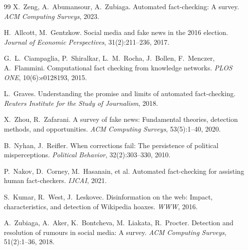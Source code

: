 \documentclass[11pt,a4paper]{article}
\theoremstyle{definition}
\begin{document}
\begin{thebibliography}{99}
X.~Zeng, A.~Abumansour, A.~Zubiaga.
\newblock Automated fact-checking: A survey.
\newblock \textit{ACM Computing Surveys}, 2023.

H.~Allcott, M.~Gentzkow.
\newblock Social media and fake news in the 2016 election.
\newblock \textit{Journal of Economic Perspectives}, 31(2):211--236, 2017.

G.~L.~Ciampaglia, P.~Shiralkar, L.~M.~Rocha, J.~Bollen, F.~Menczer, A.~Flammini.
\newblock Computational fact checking from knowledge networks.
\newblock \textit{PLOS ONE}, 10(6):e0128193, 2015.

L.~Graves.
\newblock Understanding the promise and limits of automated fact-checking.
\newblock \textit{Reuters Institute for the Study of Journalism}, 2018.

X.~Zhou, R.~Zafarani.
\newblock A survey of fake news: Fundamental theories, detection methods, and opportunities.
\newblock \textit{ACM Computing Surveys}, 53(5):1--40, 2020.

B.~Nyhan, J.~Reifler.
\newblock When corrections fail: The persistence of political misperceptions.
\newblock \textit{Political Behavior}, 32(2):303--330, 2010.

P.~Nakov, D.~Corney, M.~Hasanain, et al.
\newblock Automated fact-checking for assisting human fact-checkers.
\newblock \textit{IJCAI}, 2021.

S.~Kumar, R.~West, J.~Leskovec.
\newblock Disinformation on the web: Impact, characteristics, and detection of Wikipedia hoaxes.
\newblock \textit{WWW}, 2016.

A.~Zubiaga, A.~Aker, K.~Bontcheva, M.~Liakata, R.~Procter.
\newblock Detection and resolution of rumours in social media: A survey.
\newblock \textit{ACM Computing Surveys}, 51(2):1--36, 2018.

\end{thebibliography}
\end{document}
